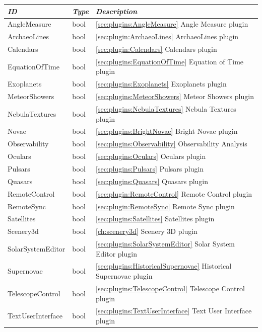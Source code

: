 \begin{longtable}{l|l|p{80mm}}
\toprule
\emph{ID} & \emph{Type} & \emph{Description}\\\midrule
AngleMeasure          & bool & \ref{sec:plugins:AngleMeasure} Angle Measure plugin\\
ArchaeoLines          & bool & \ref{sec:plugin:ArchaeoLines} ArchaeoLines plugin\\
Calendars             & bool & \ref{sec:plugin:Calendars} Calendars plugin\\
EquationOfTime        & bool & \ref{sec:plugins:EquationOfTime} Equation of Time plugin\\
Exoplanets            & bool & \ref{sec:plugins:Exoplanets} Exoplanets plugin \\
MeteorShowers         & bool & \ref{sec:plugins:MeteorShowers} Meteor Showers plugin \\
NebulaTextures        & bool & \ref{sec:plugins:NebulaTextures} Nebula Textures plugin \\
Novae                 & bool & \ref{sec:plugins:BrightNovae} Bright Novae plugin \\
Observability         & bool & \ref{sec:plugins:Observability} Observability Analysis\\
Oculars               & bool & \ref{sec:plugins:Oculars} Oculars plugin \\
Pulsars               & bool & \ref{sec:plugins:Pulsars} Pulsars plugin \\
Quasars               & bool & \ref{sec:plugins:Quasars} Quasars plugin \\
RemoteControl         & bool & \ref{sec:plugin:RemoteControl} Remote Control plugin \\
RemoteSync            & bool & \ref{sec:plugin:RemoteSync} Remote Sync plugin \\
Satellites            & bool & \ref{sec:plugins:Satellites} Satellites plugin \\
Scenery3d             & bool & \ref{ch:scenery3d} Scenery 3D plugin \\
SolarSystemEditor     & bool & \ref{sec:plugins:SolarSystemEditor} Solar System Editor plugin\\
Supernovae            & bool & \ref{sec:plugins:HistoricalSupernovae} Historical Supernovae plugin \\
TelescopeControl      & bool & \ref{sec:plugins:TelescopeControl} Telescope Control plugin \\
TextUserInterface     & bool & \ref{sec:plugins:TextUserInterface} Text User Interface plugin \\\bottomrule
\end{longtable}

